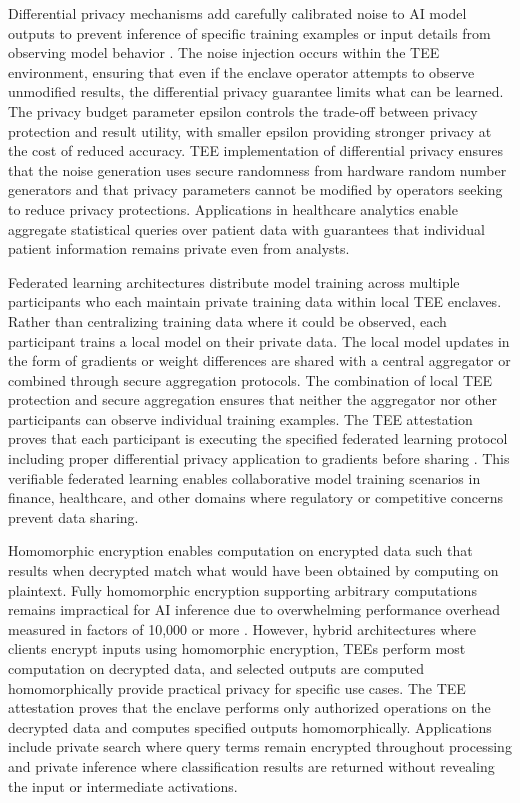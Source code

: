 Differential privacy mechanisms add carefully calibrated noise to AI model outputs to prevent inference of specific training examples or input details from observing model behavior \cite{differential_privacy}. The noise injection occurs within the TEE environment, ensuring that even if the enclave operator attempts to observe unmodified results, the differential privacy guarantee limits what can be learned. The privacy budget parameter epsilon controls the trade-off between privacy protection and result utility, with smaller epsilon providing stronger privacy at the cost of reduced accuracy. TEE implementation of differential privacy ensures that the noise generation uses secure randomness from hardware random number generators and that privacy parameters cannot be modified by operators seeking to reduce privacy protections. Applications in healthcare analytics enable aggregate statistical queries over patient data with guarantees that individual patient information remains private even from analysts.

Federated learning architectures distribute model training across multiple participants who each maintain private training data within local TEE enclaves. Rather than centralizing training data where it could be observed, each participant trains a local model on their private data. The local model updates in the form of gradients or weight differences are shared with a central aggregator or combined through secure aggregation protocols. The combination of local TEE protection and secure aggregation ensures that neither the aggregator nor other participants can observe individual training examples. The TEE attestation proves that each participant is executing the specified federated learning protocol including proper differential privacy application to gradients before sharing \cite{federated_learning}. This verifiable federated learning enables collaborative model training scenarios in finance, healthcare, and other domains where regulatory or competitive concerns prevent data sharing.

Homomorphic encryption enables computation on encrypted data such that results when decrypted match what would have been obtained by computing on plaintext. Fully homomorphic encryption supporting arbitrary computations remains impractical for AI inference due to overwhelming performance overhead measured in factors of 10,000 or more \cite{homomorphic_encryption}. However, hybrid architectures where clients encrypt inputs using homomorphic encryption, TEEs perform most computation on decrypted data, and selected outputs are computed homomorphically provide practical privacy for specific use cases. The TEE attestation proves that the enclave performs only authorized operations on the decrypted data and computes specified outputs homomorphically. Applications include private search where query terms remain encrypted throughout processing and private inference where classification results are returned without revealing the input or intermediate activations.

